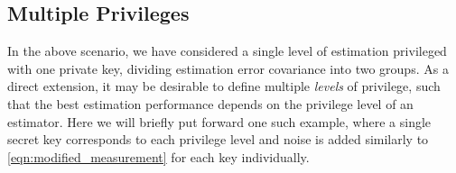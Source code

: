 \documentclass[letterpaper, 10 pt, conference]{IEEEtran}
\theoremstyle{definition}
\theoremstyle{definition}
\theoremstyle{remark}
\begin{document}
% 
% 

\subsection{Multiple Privileges}\label{subsec:mult_privileges}
In the above scenario, we have considered a single level of estimation privileged with one private key, dividing estimation error covariance into two groups. As a direct extension, it may be desirable to define multiple \textit{levels} of privilege, such that the best estimation performance depends on the privilege level of an estimator. Here we will briefly put forward one such example, where a single secret key corresponds to each privilege level and noise is added similarly to \eqref{eqn:modified_measurement} for each key individually.
\end{document}
